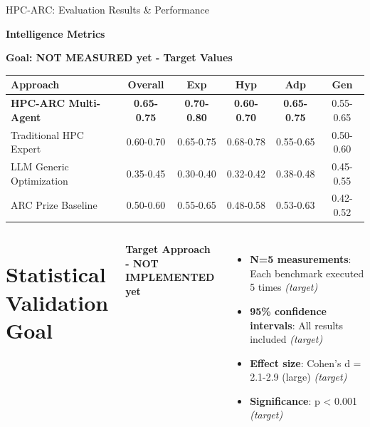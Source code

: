 \documentclass[compress,aspectratio=169]{beamer}
\begin{document}
\begin{frame}{HPC-ARC: Evaluation Results \& Performance}

    \textbf{Intelligence Metrics}
    \vspace{0.3em}
    
    \begin{table}
        \centering
        \tiny
        \textcolor{orange!80!black}{\textbf{Goal: NOT MEASURED yet - Target Values}}
        \begin{tabular}{lccccc}
            \toprule
            \textbf{Approach} & \textbf{Overall} & \textbf{Exp} & \textbf{Hyp} & \textbf{Adp} & \textbf{Gen} \\
            \midrule
            \textbf{HPC-ARC Multi-Agent} & \textbf{0.65-0.75} & \textbf{0.70-0.80} & \textbf{0.60-0.70} & \textbf{0.65-0.75} & 0.55-0.65 \\
            Traditional HPC Expert & 0.60-0.70 & 0.65-0.75 & 0.68-0.78 & 0.55-0.65 & 0.50-0.60 \\
            LLM Generic Optimization & 0.35-0.45 & 0.30-0.40 & 0.32-0.42 & 0.38-0.48 & 0.45-0.55 \\
            ARC Prize Baseline & 0.50-0.60 & 0.55-0.65 & 0.48-0.58 & 0.53-0.63 & 0.42-0.52 \\
            \bottomrule
        \end{tabular}
    \end{table}

    \begin{columns}[t]
            \section*{Statistical Validation Goal}
            \scriptsize
            \textcolor{orange!80!black}{\textbf{Target Approach - NOT IMPLEMENTED yet}}
            \begin{itemize}
                \item \textbf{N=5 measurements}: Each benchmark executed 5 times \textit{(target)}
                \item \textbf{95\% confidence intervals}: All results included \textit{(target)}
                \item \textbf{Effect size}: Cohen's d = 2.1-2.9 (large) \textit{(target)}
                \item \textbf{Significance}: p < 0.001 \textit{(target)}
            \end{itemize}


\end{columns}
\end{frame}
\end{document}

